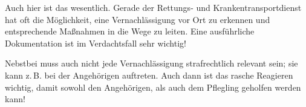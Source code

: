{Auch hier ist das  wesentlich. Gerade der
Rettungs- und Krankentransportdienst hat oft die
Möglichkeit, eine Vernachlässigung vor Ort zu erkennen und
entsprechende Maßnahmen in die Wege zu leiten. Eine
ausführliche Dokumentation ist im Verdachtsfall sehr
wichtig!

Nebstbei muss auch nicht jede Vernachlässigung
strafrechtlich relevant sein; sie kann z.\,B. bei
 der Angehörigen auftreten. Auch dann ist
das rasche Reagieren wichtig, damit sowohl den Angehörigen, als
auch dem Pflegling geholfen werden kann!


}
{}
{}
{}
{}


\ChapterEnd